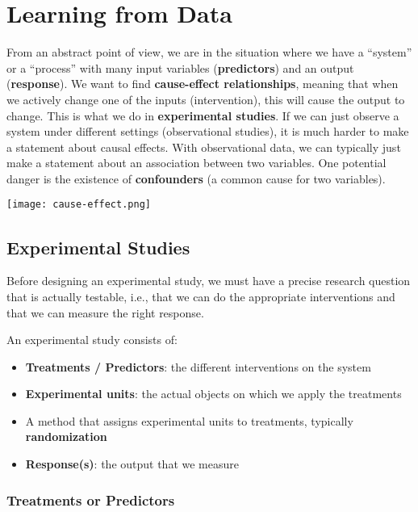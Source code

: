 \section{Learning from Data}

From an abstract point of view, we are in the situation where we have a “system” or a “process” with many input variables (\textbf{predictors}) and an output (\textbf{response}). We want to find \textbf{cause-effect relationships}, meaning that when we actively change one of the inputs (intervention), this will cause the output to change. This is what we do in \textbf{experimental studies}. If we can just observe a system under different settings (observational studies), it is much harder to make a statement about causal effects. With observational data, we can typically just make a statement about an association between two variables. One potential danger is the existence of \textbf{confounders} (a common cause for two variables).

\begin{center}
	\texttt{[image: cause-effect.png]}
\end{center}


\subsection{Experimental Studies}

Before designing an experimental study, we must have a precise research question that is actually testable, i.e., that we can do the appropriate interventions and that we can measure the right response. \medskip

An experimental study consists of:

\begin{itemize}
	\item \textbf{Treatments / Predictors}: the different interventions on the system
	\item \textbf{Experimental units}: the actual objects on which we apply the treatments
	\item A method that assigns experimental units to treatments, typically \textbf{randomization}
	\item \textbf{Response(s)}: the output that we measure
\end{itemize}

\subsubsection{Treatments or Predictors}

